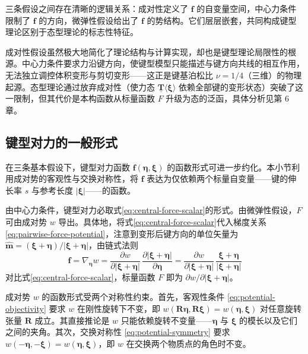 三条假设之间存在清晰的逻辑关系：成对性定义了 $\mathbf{f}$ 的自变量空间，中心力条件限制了 $\mathbf{f}$ 的方向，微弹性假设给出了 $\mathbf{f}$ 的势结构。它们层层嵌套，共同构成键型理论区别于态型理论的标志性特征。

\begin{remark}
成对性假设虽然极大地简化了理论结构与计算实现，却也是键型理论局限性的根源。中心力条件要求力沿键方向，使键型模型只能描述与键方向共线的相互作用，无法独立调控体积变形与剪切变形——这正是键基泊松比 $\nu=1/4$（三维）的物理起源。态型理论通过放弃成对性（使力态 $\underline{\mathbf{T}}\langle\boldsymbol{\xi}\rangle$ 依赖全部键的变形状态）突破了这一限制，但其代价是本构函数从标量函数 $F$ 升级为态的泛函，具体分析见第 6 章。
\end{remark}

\subsection{键型对力的一般形式}

在三条基本假设下，键型对力函数 $\mathbf{f}(\boldsymbol{\eta},\boldsymbol{\xi})$ 的函数形式可进一步约化。本小节利用成对势的客观性与交换对称性，将 $\mathbf{f}$ 表达为仅依赖两个标量自变量——键的伸长率 $s$ 与参考长度 $|\boldsymbol{\xi}|$——的函数。

由中心力条件，键型对力必取式\eqref{eq:central-force-scalar}的形式。由微弹性假设，$F$ 可由成对势 $w$ 导出。具体地，将式\eqref{eq:central-force-scalar}代入梯度关系 \eqref{eq:pairwise-force-potential}，注意到变形后键方向的单位矢量为 $\hat{\mathbf{m}}=(\boldsymbol{\xi}+\boldsymbol{\eta})/|\boldsymbol{\xi}+\boldsymbol{\eta}|$，由链式法则
\begin{equation}
\mathbf{f} = \nabla_{\boldsymbol{\eta}} w = \frac{\partial w}{\partial |\boldsymbol{\xi}+\boldsymbol{\eta}|}\,\frac{\partial |\boldsymbol{\xi}+\boldsymbol{\eta}|}{\partial \boldsymbol{\eta}}
= \frac{\partial w}{\partial |\boldsymbol{\xi}+\boldsymbol{\eta}|}\,\frac{\boldsymbol{\xi}+\boldsymbol{\eta}}{|\boldsymbol{\xi}+\boldsymbol{\eta}|}
\label{eq:force-from-w}
\end{equation}
对比式\eqref{eq:central-force-scalar}，标量函数 $F$ 即为 $\partial w/\partial |\boldsymbol{\xi}+\boldsymbol{\eta}|$。

成对势 $w$ 的函数形式受两个对称性约束。首先，客观性条件 \eqref{eq:potential-objectivity} 要求 $w$ 在刚性旋转下不变，即 $w(\mathbf{R}\boldsymbol{\eta},\mathbf{R}\boldsymbol{\xi})=w(\boldsymbol{\eta},\boldsymbol{\xi})$ 对任意旋转张量 $\mathbf{R}$ 成立。其直接推论是 $w$ 只能依赖旋转不变量——$\boldsymbol{\eta}$ 与 $\boldsymbol{\xi}$ 的模长以及它们之间的夹角。其次，交换对称性 \eqref{eq:potential-symmetry} 要求 $w(-\boldsymbol{\eta},-\boldsymbol{\xi})=w(\boldsymbol{\eta},\boldsymbol{\xi})$，即 $w$ 在交换两个物质点的角色时不变。

